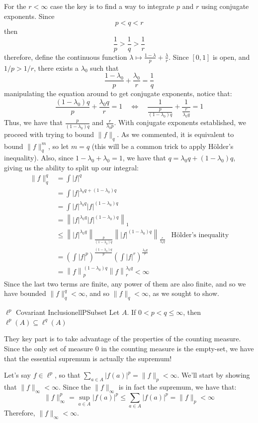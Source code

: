 \documentclass[oneside]{book}
\newcommand{\sse}{\subseteq}
\newcommand{\LRw}{\Leftrightarrow}
\begin{document}
\begin{Proof}
	For the $r < \infty$ case the key is to find a way to integrate $p$ and $r$ using conjugate exponents. Since
	\[
		p < q < r
	\]
	then
	\[
		\frac{1}{p} > \frac{1}{q} > \frac{1}{r}
	\]
	therefore, define the continuous function $\lambda \mapsto \frac{1-\lambda}{p} + \frac{\lambda}{r}$. Since $[0,1]$
	is open, and $1/p > 1/r$, there exists a $\lambda_0$ such that
	\[
		\frac{1-\lambda_0}{p} + \frac{\lambda_0}{r} = \frac{1}{q}
	\]
	manipulating the equation around to get conjugate exponents, notice that:
	\[
		\frac{(1-\lambda_0)q}{p} + \frac{\lambda_0q}{r} = 1\quad\LRw\quad \frac{1}{\frac{p}{(1-\lambda_0)q}}
		+ \frac{1}{\frac{r}{\lambda_0q}} = 1
	\]
	Thus, we have that $\frac{p}{(1-\lambda_0)q}$ and $\frac{r}{\lambda_0p}$. With conjugate exponents established, we
	proceed with trying to bound $\|f\|_q$. As we commented, it is equivalent to bound $\|f\|_q^m$, so let $m = q$ (this
	will be a common trick to apply H\"older's inequality). Also, since $1-\lambda_0 + \lambda_0 = 1$, we have that $q
	= \lambda_0 q + (1-\lambda_0)q$, giving us the ability to split up our integral:
	\begin{align*}
		\|f\|_q^q &= \int |f|^q\\
				  &= \int |f|^{\lambda_0 q + (1-\lambda_0)q}\\
				  &= \int |f|^{\lambda_0 q}|f|^{(1-\lambda_0)q}\\
				  &=\left\||f|^{\lambda_0 q}|f|^{(1-\lambda_0)q}\right\|_1\\
				  &\le \left\||f|^{\lambda_0 q}\right\|_{\frac{p}{(1-\lambda_0) q}}\left\||f|^{(1-\lambda_0)
	q}\right\|_{\frac{r}{\lambda_0 q}} &\text{H\"older's inequality}\\
									   &= \left(\int |f|^p\right)^{\frac{(1-\lambda_0)q}{p}} \left(\int
										   |f|^r\right)^{\frac{\lambda_0q}{r}}\\
									   &= \left\|f\right\|_p^{(1-\lambda_0) q}\left\|f\right\|_r^{\lambda_0 q}
										   < \infty
	\end{align*}
	Since the last two terms are finite, any power of them are also finite, and so we have bounded $\|f\|_q^q < \infty$,
	and so $\|f\|_q < \infty$, as we sought to show. 
\end{Proof}

\begin{prop}{$\ell^p$ Covariant Inclusion}{ellPSubset}
	Let $A$. If $0 < p < q \le \infty$, then $\ell^p(A) \sse \ell^q(A)$ 
\end{prop}

\begin{Proof}
	They key part is to take advantage of the properties of the counting measure. Since
	the only set of measure $0$ in the counting measure is the empty-set, we have that the essential supremum is
	actually the supremum! 

	Let's say $f \in \ell^p$, so that $\sum_{a \in A} |f(a)|^p = \|f\|_p < \infty$. We'll start by showing that
	$\|f\|_\infty < \infty$. Since the $\|f\|_\infty$ is in fact the supremum, we have that:
	\[
		\|f\|_\infty^p = \sup_{a \in A} |f(a)|^p \le \sum_{a \in A} |f(a)|^p = \|f\|_p < \infty
	\]
	Therefore, $\|f\|_\infty < \infty$. 
\end{Proof}
\end{document}
